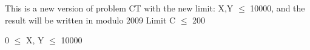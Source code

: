 This is a new version of problem CT with the new limit: X,Y $\le$ 10000, and the result will be written in modulo 2009
Limit
C  $\le$  200   


   0  $\le$  X, Y  $\le$  10000